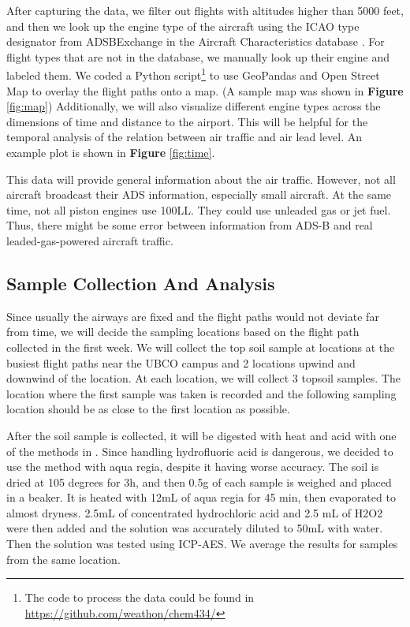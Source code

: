 \documentclass[12pt]{article}
\begin{document}
After capturing the data, we filter out flights with altitudes higher than 5000 feet, and then we look up the engine type of the aircraft using the ICAO type designator from ADSBExchange in the Aircraft Characteristics database \cite{faa}. For flight types that are not in the database, we manually look up their engine and labeled them. We coded a Python script\footnote{The code to process the data could be found in \url{https://github.com/weathon/chem434/}} to use GeoPandas and Open Street Map \cite{OpenStreetMap} to overlay the flight paths onto a map. (A sample map was shown in \textbf{Figure} \ref{fig:map}) Additionally, we will also visualize different engine types across the dimensions of time and distance to the airport. This will be helpful for the temporal analysis of the relation between air traffic and air lead level. An example plot is shown in \textbf{Figure} \ref{fig:time}.


This data will provide general information about the air traffic. However, not all aircraft broadcast their ADS information, especially small aircraft. At the same time, not all piston engines use 100LL. They could use unleaded gas or jet fuel. Thus, there might be some error between information from ADS-B and real leaded-gas-powered aircraft traffic. 

\subsection{Sample Collection And Analysis}
Since usually the airways are fixed and the flight paths would not deviate far from time, we will decide the sampling locations based on the flight path collected in the first week. We will collect the top soil sample at locations at the busiest flight paths near the UBCO campus and 2 locations upwind and downwind of the location. At each location, we will collect 3 topsoil samples. The location where the first sample was taken is recorded and the following sampling location should be as close to the first location as possible. 

After the soil sample is collected, it will be digested with heat and acid with one of the methods in  \cite{moor_determination_2001}. Since handling hydrofluoric acid is dangerous, we decided to use the method with aqua regia, despite it having worse accuracy. The soil is dried at 105 degrees for 3h, and then 0.5g of each sample is weighed and placed in a beaker. It is heated with 12mL of aqua regia for 45 min, then evaporated to almost dryness. 2.5mL of concentrated hydrochloric acid and 2.5 mL of H2O2 were then added and the solution was accurately diluted to 50mL with water. \cite{moor_determination_2001} Then the solution was tested using ICP-AES. We average the results for samples from the same location. 
\end{document}
